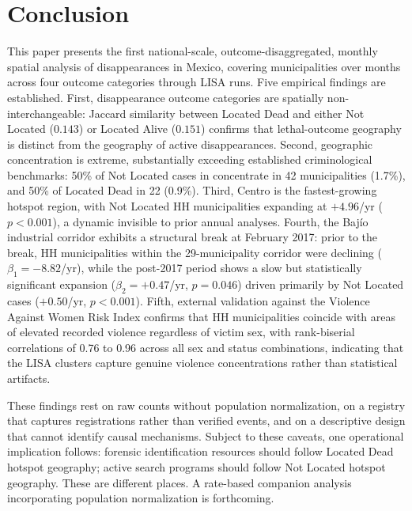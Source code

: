 \section{Conclusion}
\label{sec:conclusion}

This paper presents the first national-scale, outcome-disaggregated, monthly spatial analysis of disappearances in Mexico, covering \nmunis{} municipalities over \nmonths{} months across four outcome categories through \nLISAruns{} LISA runs.
Five empirical findings are established.
First, disappearance outcome categories are spatially non-interchangeable: Jaccard similarity between Located Dead and either Not Located ($0.143$) or Located Alive ($0.151$) confirms that lethal-outcome geography is distinct from the geography of active disappearances.
Second, geographic concentration is extreme, substantially exceeding established criminological benchmarks: 50\% of Not Located cases in  concentrate in 42 municipalities (1.7\%), and 50\% of Located Dead in 22 (0.9\%).
Third, Centro is the fastest-growing hotspot region, with Not Located HH municipalities expanding at $+4.96$/yr ($p < 0.001$), a dynamic invisible to prior annual analyses.
Fourth, the Baj\'{i}o industrial corridor exhibits a structural break at February 2017: prior to the break, HH municipalities within the 29-municipality corridor were declining ($\beta_1 = -8.82$/yr), while the post-2017 period shows a slow but statistically significant expansion ($\beta_2 = +0.47$/yr, $p = 0.046$) driven primarily by Not Located cases ($+0.50$/yr, $p < 0.001$). Fifth, external validation against the Violence Against Women Risk Index confirms that HH municipalities coincide with areas of elevated recorded violence regardless of victim sex, with rank-biserial correlations of 0.76 to 0.96 across all sex and status combinations, indicating that the LISA clusters capture genuine violence concentrations rather than statistical artifacts.


These findings rest on raw counts without population normalization, on a registry that captures registrations rather than verified events, and on a descriptive design that cannot identify causal mechanisms.
Subject to these caveats, one operational implication follows: forensic identification resources should follow Located Dead hotspot geography; active search programs should follow Not Located hotspot geography.
These are different places.
A rate-based companion analysis incorporating population normalization is forthcoming.